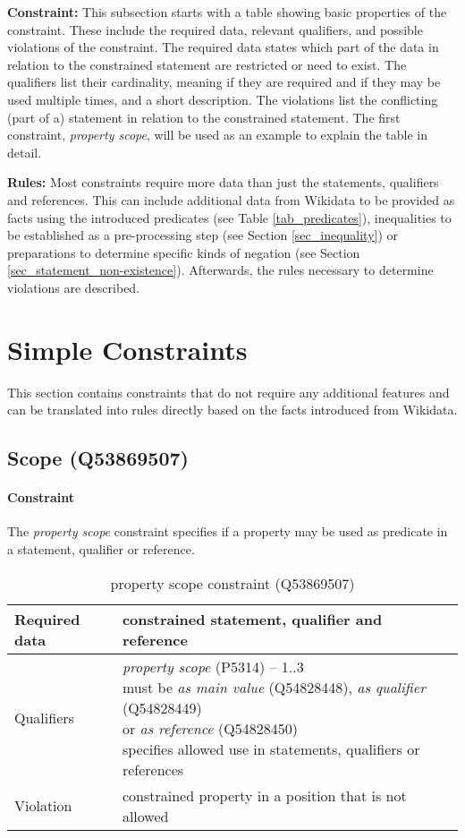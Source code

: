 \documentclass[hyperref,bachelorofscience,fleqn]{cgvpub}
\begin{document}
{\bf Constraint:} This subsection starts with a table showing basic properties of the constraint. These include the required data, relevant qualifiers, and possible violations of the constraint. The required data states which part of the data in relation to the constrained statement are restricted or need to exist. The qualifiers list their cardinality, meaning if they are required and if they may be used multiple times, and a short description. The violations list the conflicting (part of a) statement in relation to the constrained statement. The first constraint, \emph{property scope}, will be used as an example to explain the table in detail.

{\bf Rules:} Most constraints require more data than just the statements, qualifiers and references. This can include additional data from Wikidata to be provided as facts using the introduced predicates (see Table \ref{tab_predicates}), inequalities to be established as a pre-processing step (see Section \ref{sec_inequality}) or preparations to determine specific kinds of negation (see Section \ref{sec_statement_non-existence}). Afterwards, the rules necessary to determine violations are described.

\section{Simple Constraints}\label{sec_simple_constraints}
This section contains constraints that do not require any additional features and can be translated into rules directly based on the facts introduced from Wikidata.

\subsection{Scope (Q53869507)}
\paragraph{Constraint}
The \emph{property scope} constraint specifies if a property may be used as predicate in a statement, qualifier or reference.
\begin{table}[H]
\caption{property scope constraint (Q53869507)}
\begin{tabularx}{\textwidth}{ ll X}
\hline
Required data & constrained statement, qualifier and reference \\
\hline
Qualifiers & \makecell{\emph{property scope} (P5314) -- 1..3 \\ must be \emph{as main value} (Q54828448), \emph{as qualifier} (Q54828449) \\ or \emph{as reference} (Q54828450) \\ specifies allowed use in statements, qualifiers or references} \\
\hline
Violation & constrained property in a position that is not allowed \\
\hline
\end{tabularx}
\end{table}
\end{document}
